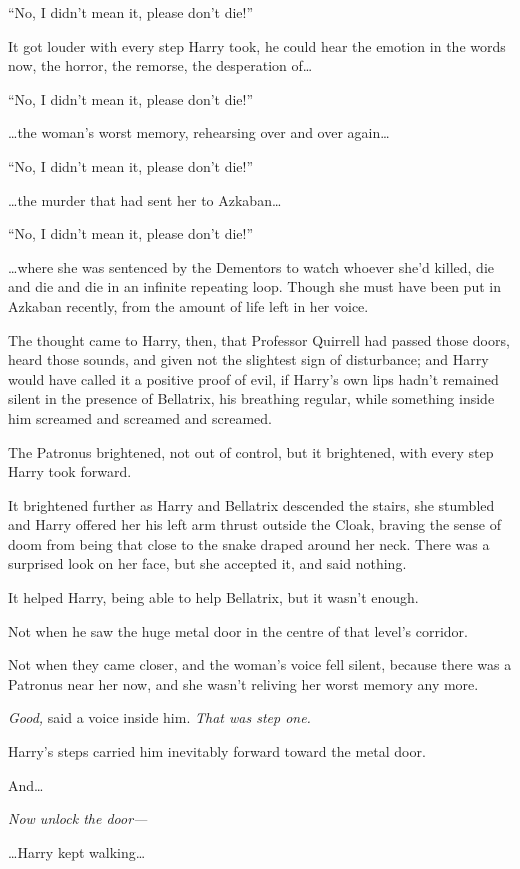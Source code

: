 “No, I didn’t mean it, please don’t die!”

It got louder with every step Harry took, he could hear the emotion in the words now, the horror, the remorse, the desperation of…

“No, I didn’t mean it, please don’t die!”

…the woman’s worst memory, rehearsing over and over again…

“No, I didn’t mean it, please don’t die!”

…the murder that had sent her to Azkaban…

“No, I didn’t mean it, please don’t die!”

…where she was sentenced by the Dementors to watch whoever she’d killed, die and die and die in an infinite repeating loop. Though she must have been put in Azkaban recently, from the amount of life left in her voice.

The thought came to Harry, then, that Professor Quirrell had passed those doors, heard those sounds, and given not the slightest sign of disturbance; and Harry would have called it a positive proof of evil, if Harry’s own lips hadn’t remained silent in the presence of Bellatrix, his breathing regular, while something inside him screamed and screamed and screamed.

The Patronus brightened, not out of control, but it brightened, with every step Harry took forward.

It brightened further as Harry and Bellatrix descended the stairs, she stumbled and Harry offered her his left arm thrust outside the Cloak, braving the sense of doom from being that close to the snake draped around her neck. There was a surprised look on her face, but she accepted it, and said nothing.

It helped Harry, being able to help Bellatrix, but it wasn’t enough.

Not when he saw the huge metal door in the centre of that level’s corridor.

Not when they came closer, and the woman’s voice fell silent, because there was a Patronus near her now, and she wasn’t reliving her worst memory any more.

\emph{Good,} said a voice inside him. \emph{That was step one.}

Harry’s steps carried him inevitably forward toward the metal door.

And…

\emph{Now unlock the door—}

…Harry kept walking…

